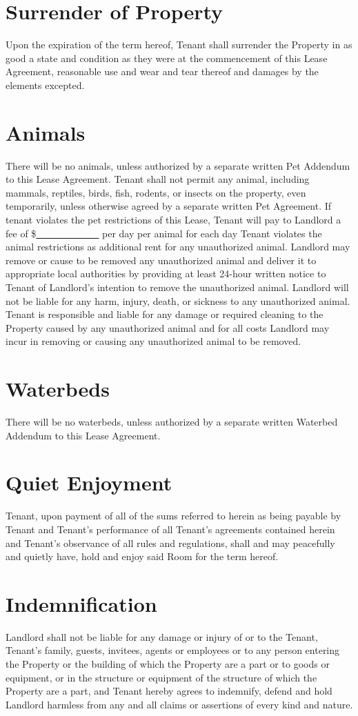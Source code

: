 \documentclass{amsart}
\begin{document}
\section{Surrender of Property}
Upon the expiration of the term hereof, Tenant shall surrender the
Property in as good a state and condition as they were at the commencement of this 
Lease Agreement, reasonable use and wear and tear thereof and damages by the elements
excepted.
\section{Animals}
There will be no animals, unless authorized by a separate written Pet Addendum
to this Lease Agreement. Tenant shall not permit any animal, including mammals,
reptiles, birds, fish, rodents, or insects on the property, even temporarily,
unless otherwise agreed by a separate written Pet Agreement. If tenant violates
the pet restrictions of this Lease, Tenant will pay to Landlord a fee of
\$\underline{\ \ \ \ \ \ \ \ \ \ \ \ \ } per day per animal for each day Tenant
violates the animal restrictions as additional rent for any unauthorized animal.
Landlord may remove or cause to be removed any unauthorized animal and deliver
it to appropriate local authorities by providing at least 24-hour written notice
to Tenant of Landlord's intention to remove the unauthorized animal. Landlord
will not be liable for any harm, injury, death, or sickness to any unauthorized
animal. Tenant is responsible and liable for any damage or required cleaning to
the Property caused by any unauthorized animal and for all costs Landlord may
incur in removing or causing any unauthorized animal to be removed.
\section{Waterbeds}
There will be no waterbeds, unless authorized by a separate written Waterbed
Addendum to this Lease Agreement.
\section{Quiet Enjoyment}
Tenant, upon payment of all of the sums referred to herein as being payable by
Tenant and Tenant's performance of all Tenant's agreements contained herein and
Tenant's observance of all rules and regulations, shall and may peacefully and
quietly have, hold and enjoy said Room for the term hereof.
\section{Indemnification}
Landlord shall not be liable for any damage or injury of or to the Tenant,
Tenant's family, guests, invitees, agents or employees or to any person entering
the Property or the building of which the Property are a part or to goods or
equipment, or in the structure or equipment of the structure of which the
Property are a part, and Tenant hereby agrees to indemnify, defend and hold
Landlord harmless from any and all claims or assertions of every kind and
nature.
\end{document}

